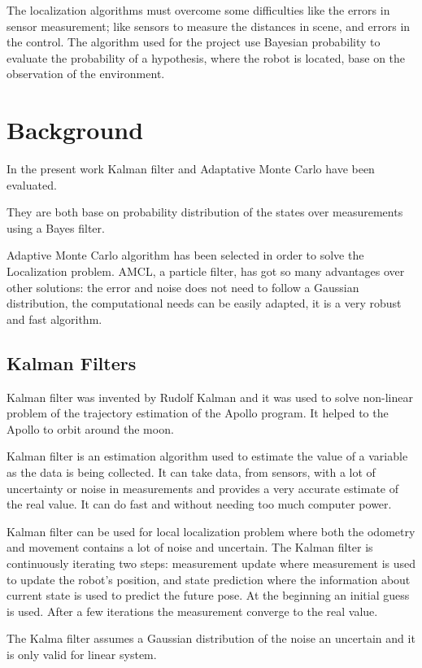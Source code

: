\documentclass[10pt,journal,compsoc]{IEEEtran}
\begin{document}
The localization algorithms must overcome some difficulties like the errors in sensor measurement; like sensors to measure the distances in scene, and errors in the control. The algorithm used for the project use Bayesian probability to evaluate the probability of a hypothesis, where the robot is located, base on the observation of the environment.

\section{Background}
In the present work Kalman filter and Adaptative Monte Carlo have been evaluated. 

They are both base on probability distribution of the states over measurements using a Bayes filter. 

Adaptive Monte Carlo algorithm has been selected in order to solve the Localization problem. AMCL, a particle filter, has got so many advantages over other solutions: the error and noise does not need to follow a Gaussian distribution, the computational needs can be easily adapted, it is a very robust and fast algorithm.\cite{lamport1994latex}

\subsection{Kalman Filters}

Kalman filter was invented by Rudolf Kalman and it was used to solve non-linear problem of the trajectory estimation of the Apollo program. It helped to the Apollo to orbit around the moon. 

Kalman filter is an estimation algorithm used to estimate the value of a variable as the data is being collected. It can take data, from sensors, with a lot of uncertainty or noise in measurements and provides a very accurate estimate of the real value. It can do fast and without needing too much computer power. 

Kalman filter can be used for local localization problem where both the odometry and movement contains a lot of noise and uncertain. The Kalman filter is continuously iterating two steps: measurement update where measurement is used to update the robot's position, and state prediction where the information about current state is used to predict the future pose. At the beginning an initial guess is used. After a few iterations the measurement converge to the real value.

The Kalma filter assumes a Gaussian distribution of the noise an uncertain and it is only valid for linear system.
\end{document}
